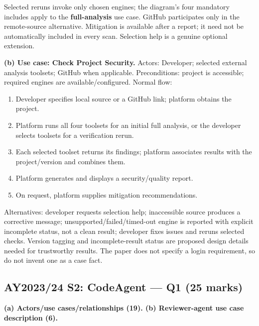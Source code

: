\begin{studycolumns}
\vspace{0pt}



Selected reruns invoke only chosen engines; the diagram's four mandatory includes apply to the \textbf{full-analysis} use case. GitHub participates only in the remote-source alternative. Mitigation is available after a report; it need not be automatically included in every scan. Selection help is a genuine optional extension.

\textbf{(b) Use case: Check Project Security.} Actors: Developer; selected external analysis toolsets; GitHub when applicable. Preconditions: project is accessible; required engines are available/\allowbreak{}configured. Normal flow:

\begin{enumerate}
\item Developer specifies local source or a GitHub link; platform obtains the project.
\item Platform runs all four toolsets for an initial full analysis, or the developer selects toolsets for a verification rerun.
\item Each selected toolset returns its findings; platform associates results with the project/\allowbreak{}version and combines them.
\item Platform generates and displays a security/\allowbreak{}quality report.
\item On request, platform supplies mitigation recommendations.
\end{enumerate}
Alternatives: developer requests selection help; inaccessible source produces a corrective message; unsupported/\allowbreak{}failed/\allowbreak{}timed-out engine is reported with explicit incomplete status, not a clean result; developer fixes issues and reruns selected checks. Version tagging and incomplete-result status are proposed design details needed for trustworthy results. The paper does not specify a login requirement, so do not invent one as a case fact.
\end{studycolumns}

\par\Needspace{85pt}\subsection*{AY2023/24 S2: CodeAgent --- Q1 (25 marks)}\label{old-2324-s2-q1}

\textbf{(a) Actors/\allowbreak{}use cases/\allowbreak{}relationships (19). (b) Reviewer-agent use case description (6).}


